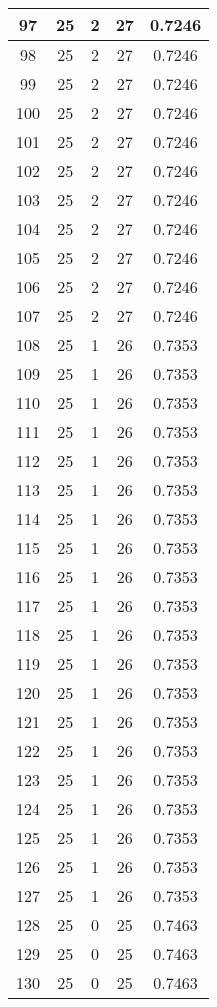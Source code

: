 \documentclass[letterpaper, 12pt]{article}
\begin{document}
\begin{longtable}{|c|c|c|c|c|}
\hline
97 & 25 & 2 & 27 & 0.7246 \\
\hline
98 & 25 & 2 & 27 & 0.7246 \\
\hline
99 & 25 & 2 & 27 & 0.7246 \\
\hline
100 & 25 & 2 & 27 & 0.7246 \\
\hline
101 & 25 & 2 & 27 & 0.7246 \\
\hline
102 & 25 & 2 & 27 & 0.7246 \\
\hline
103 & 25 & 2 & 27 & 0.7246 \\
\hline
104 & 25 & 2 & 27 & 0.7246 \\
\hline
105 & 25 & 2 & 27 & 0.7246 \\
\hline
106 & 25 & 2 & 27 & 0.7246 \\
\hline
107 & 25 & 2 & 27 & 0.7246 \\
\hline
108 & 25 & 1 & 26 & 0.7353 \\
\hline
109 & 25 & 1 & 26 & 0.7353 \\
\hline
110 & 25 & 1 & 26 & 0.7353 \\
\hline
111 & 25 & 1 & 26 & 0.7353 \\
\hline
112 & 25 & 1 & 26 & 0.7353 \\
\hline
113 & 25 & 1 & 26 & 0.7353 \\
\hline
114 & 25 & 1 & 26 & 0.7353 \\
\hline
115 & 25 & 1 & 26 & 0.7353 \\
\hline
116 & 25 & 1 & 26 & 0.7353 \\
\hline
117 & 25 & 1 & 26 & 0.7353 \\
\hline
118 & 25 & 1 & 26 & 0.7353 \\
\hline
119 & 25 & 1 & 26 & 0.7353 \\
\hline
120 & 25 & 1 & 26 & 0.7353 \\
\hline
121 & 25 & 1 & 26 & 0.7353 \\
\hline
122 & 25 & 1 & 26 & 0.7353 \\
\hline
123 & 25 & 1 & 26 & 0.7353 \\
\hline
124 & 25 & 1 & 26 & 0.7353 \\
\hline
125 & 25 & 1 & 26 & 0.7353 \\
\hline
126 & 25 & 1 & 26 & 0.7353 \\
\hline
127 & 25 & 1 & 26 & 0.7353 \\
\hline
128 & 25 & 0 & 25 & 0.7463 \\
\hline
129 & 25 & 0 & 25 & 0.7463 \\
\hline
130 & 25 & 0 & 25 & 0.7463 \\

\end{longtable}
\end{document}

